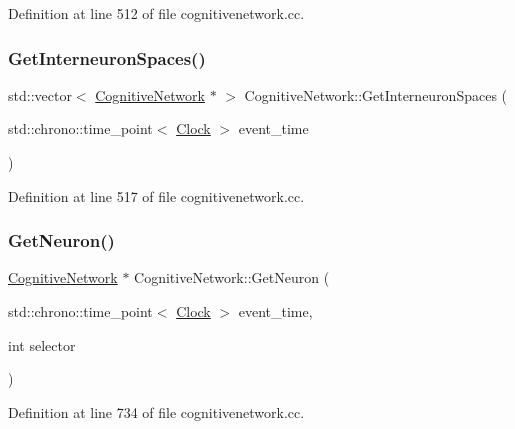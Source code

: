Definition at line 512 of file cognitivenetwork.\+cc.

\mbox{\label{class_cognitive_network_a4daf966882d527b784bd359794ad39ca}} 
\subsubsection{\texorpdfstring{Get\+Interneuron\+Spaces()}{GetInterneuronSpaces()}}
{\footnotesize\ttfamily std\+::vector$<$ \mbox{\hyperlink{class_cognitive_network}{Cognitive\+Network}} $\ast$ $>$ Cognitive\+Network\+::\+Get\+Interneuron\+Spaces (\begin{DoxyParamCaption}\item[{std\+::chrono\+::time\+\_\+point$<$ \mbox{\hyperlink{universe_8h_a0ef8d951d1ca5ab3cfaf7ab4c7a6fd80}{Clock}} $>$}]{event\+\_\+time }\end{DoxyParamCaption})}



Definition at line 517 of file cognitivenetwork.\+cc.

\mbox{\label{class_cognitive_network_ac12f0af92d878d45dca7303dc065c383}} 
\subsubsection{\texorpdfstring{Get\+Neuron()}{GetNeuron()}}
{\footnotesize\ttfamily \mbox{\hyperlink{class_cognitive_network}{Cognitive\+Network}} $\ast$ Cognitive\+Network\+::\+Get\+Neuron (\begin{DoxyParamCaption}\item[{std\+::chrono\+::time\+\_\+point$<$ \mbox{\hyperlink{universe_8h_a0ef8d951d1ca5ab3cfaf7ab4c7a6fd80}{Clock}} $>$}]{event\+\_\+time,  }\item[{int}]{selector }\end{DoxyParamCaption})}



Definition at line 734 of file cognitivenetwork.\+cc.

\mbox{\label{class_cognitive_network_af81132245e486c496a055f54a5a520d0}} 
